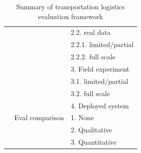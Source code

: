 \documentclass[11pt,letterpaper,onecolumn,twoside,openright,final]{report}
\begin{document}
\begin{table}[htbp]
\begin{tabular}{lp{}p{}}
        &       &   2.2. real data \\
        &       &     2.2.1. limited/partial \\
        &       &     2.2.2. full scale \\
        &       & 3. Field experiment \\
        &       &   3.1. limited/partial \\
        &       &   3.2. full scale \\
        &       & 4. Deployed system \\
    \cline{2-3}
        & Eval comparison & 1. None \\
        &       & 2. Qualitative \\
        &       & 3. Quantitative \\
    \end{tabular}%
    \caption{Summary of transportation logistics evaluation framework}
    \label{tab:transport-logistics-eval-framework}%
\end{table}%
\end{document}
